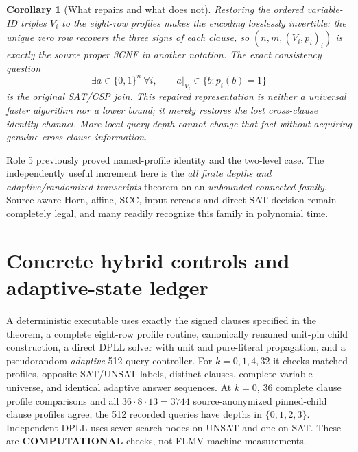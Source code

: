 \documentclass[11pt]{article}
\newtheorem{corollary}[theorem]{Corollary}
\begin{document}
\begin{corollary}[What repairs and what does not]
Restoring the ordered variable-ID triples \(V_i\) to the eight-row profiles makes the encoding losslessly invertible: the unique zero row recovers the three signs of each clause, so \((n,m,(V_i,p_i)_i)\) is exactly the source proper 3CNF in another notation. The exact consistency question
\[
\exists a\in\{0,1\}^n\ \forall i,\qquad a|_{V_i}\in\{b:p_i(b)=1\}
\]
is the original SAT/CSP join. This repaired representation is neither a universal faster algorithm nor a lower bound; it merely restores the lost cross-clause identity channel. More local query depth cannot change that fact without acquiring genuine cross-clause information.
\end{corollary}
\noindent Role 5 previously proved named-profile identity and the two-level case. The independently useful increment here is the \emph{all finite depths and adaptive/randomized transcripts} theorem on an \emph{unbounded connected family}. Source-aware Horn, affine, SCC, input rereads and direct SAT decision remain completely legal, and many readily recognize this family in polynomial time.

\section*{Concrete hybrid controls and adaptive-state ledger}
A deterministic executable uses exactly the signed clauses specified in the theorem, a complete eight-row profile routine, canonically renamed unit-pin child construction, a direct DPLL solver with unit and pure-literal propagation, and a pseudorandom \emph{adaptive} 512-query controller. For \(k=0,1,4,32\) it checks matched profiles, opposite SAT/UNSAT labels, distinct clauses, complete variable universe, and identical adaptive answer sequences. At \(k=0\), 36 complete clause profile comparisons and all \(36\cdot8\cdot13=3744\) source-anonymized pinned-child clause profiles agree; the 512 recorded queries have depths in \(\{0,1,2,3\}\). Independent DPLL uses seven search nodes on UNSAT and one on SAT. These are \textbf{COMPUTATIONAL} checks, not FLMV-machine measurements.
\end{document}
